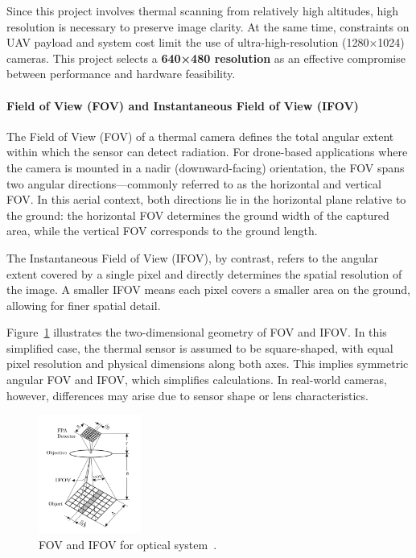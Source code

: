 Since this project involves thermal scanning from relatively high altitudes, high resolution is necessary to preserve image clarity. At the same time, constraints on UAV payload and system cost limit the use of ultra-high-resolution (1280×1024) cameras. This project selects a \textbf{640×480 resolution} as an effective compromise between performance and hardware feasibility.


\paragraph{Field of View (FOV) and Instantaneous Field of View (IFOV)}

The Field of View (FOV) of a thermal camera defines the total angular extent within which the sensor can detect radiation. For drone-based applications where the camera is mounted in a nadir (downward-facing) orientation, the FOV spans two angular directions—commonly referred to as the horizontal and vertical FOV. In this aerial context, both directions lie in the horizontal plane relative to the ground: the horizontal FOV determines the ground width of the captured area, while the vertical FOV corresponds to the ground length.

The Instantaneous Field of View (IFOV), by contrast, refers to the angular extent covered by a single pixel and directly determines the spatial resolution of the image. A smaller IFOV means each pixel covers a smaller area on the ground, allowing for finer spatial detail.

Figure~\ref{fig:fov_ifov} illustrates the two-dimensional geometry of FOV and IFOV. In this simplified case, the thermal sensor is assumed to be square-shaped, with equal pixel resolution and physical dimensions along both axes. This implies symmetric angular FOV and IFOV, which simplifies calculations. In real-world cameras, however, differences may arise due to sensor shape or lens characteristics.

\begin{figure}[H]
    \centering
    \includegraphics[width=0.3\textwidth]{figs/Huirui/fov_ifov_2d_diagram.png}
    \caption{FOV and IFOV for optical system~\cite{pencheva2006design}.}
    \label{fig:fov_ifov}
\end{figure}

